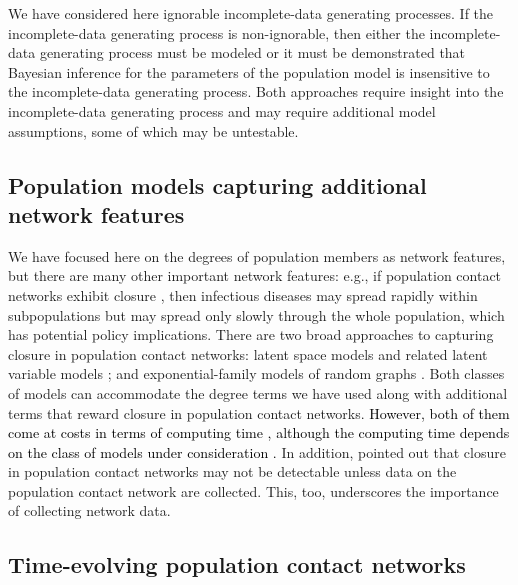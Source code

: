 \documentclass[12pt,usenatbib,referee]{article}
\renewcommand{\alert}{\textcolor{black}}
\begin{document}
We have considered here ignorable incomplete-data generating processes.
If the incomplete-data generating process is non-ignorable,
then either the incomplete-data generating process must be modeled or it must be demonstrated that Bayesian inference for the parameters of the population model is insensitive to the incomplete-data generating process.
Both approaches require insight into the incomplete-data generating process and may require additional model assumptions,
some of which may be untestable.

\subsection{Population models capturing additional network features}

We have focused here on the degrees of population members as network features,
but there are many other important network features:
e.g.,
if population contact networks exhibit closure \citep[e.g., transitive closure,][]{WsFk94,Ko09a},
then infectious diseases may spread rapidly within subpopulations but may spread only slowly through the whole population,
which has potential policy implications.
There are two broad approaches to capturing closure in population contact networks:
latent space models \citep*{HpRaHm01,HaRaTa07,SmAsCa19} and related latent variable models \citep*[e.g.,][]{latentspace,RaFrRa15,FoHo15,Ho18};
and exponential-family models of random graphs \citep*{FoSd86,SnPaRoHa04,ergm.book}.
Both classes of models can accommodate the degree terms we have used \citep*[see, e.g.,][]{KrHaRaHo07,thiemichen2016bayesian} along with additional terms that reward closure in population contact networks.
\alert{However,
both of them come at costs in terms of computing time \citep*[][]{BaBrSl11,ChDi11},
although the computing time depends on the class of models under consideration \citep*[see, e.g.,][]{karwa2016dergms}.}
In addition,
\citet{We11} pointed out that closure in population contact networks may not be detectable unless data on the population contact network are collected.
This,
too,
underscores the importance of collecting network data.

\subsection{Time-evolving population contact networks}
\label{temporal}
\end{document}
